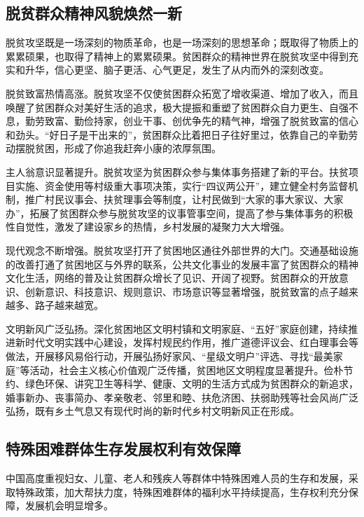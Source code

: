 \documentclass{ctexart}
\begin{document}
\subsection{脱贫群众精神风貌焕然一新}

脱贫攻坚既是一场深刻的物质革命，也是一场深刻的思想革命；既取得了物质上的累累硕果，也取得了精神上的累累硕果。贫困群众的精神世界在脱贫攻坚中得到充实和升华，信心更坚、脑子更活、心气更足，发生了从内而外的深刻改变。

脱贫致富热情高涨。脱贫攻坚不仅使贫困群众拓宽了增收渠道、增加了收入，而且唤醒了贫困群众对美好生活的追求，极大提振和重塑了贫困群众自力更生、自强不息，勤劳致富、勤俭持家，创业干事、创优争先的精气神，增强了脱贫致富的信心和劲头。“好日子是干出来的”，贫困群众比着把日子往好里过，依靠自己的辛勤劳动摆脱贫困，形成了你追我赶奔小康的浓厚氛围。

主人翁意识显著提升。脱贫攻坚为贫困群众参与集体事务搭建了新的平台。扶贫项目实施、资金使用等村级重大事项决策，实行“四议两公开”，建立健全村务监督机制，推广村民议事会、扶贫理事会等制度，让村民做到“大家的事大家议、大家办”，拓展了贫困群众参与脱贫攻坚的议事管事空间，提高了参与集体事务的积极性自觉性，激发了建设家乡的热情，乡村发展的凝聚力大大增强。

现代观念不断增强。脱贫攻坚打开了贫困地区通往外部世界的大门。交通基础设施的改善打通了贫困地区与外界的联系，公共文化事业的发展丰富了贫困群众的精神文化生活，网络的普及让贫困群众增长了见识、开阔了视野。贫困群众的开放意识、创新意识、科技意识、规则意识、市场意识等显著增强，脱贫致富的点子越来越多、路子越来越宽。

文明新风广泛弘扬。深化贫困地区文明村镇和文明家庭、“五好”家庭创建，持续推进新时代文明实践中心建设，发挥村规民约作用，推广道德评议会、红白理事会等做法，开展移风易俗行动，开展弘扬好家风、“星级文明户”评选、寻找“最美家庭”等活动，社会主义核心价值观广泛传播，贫困地区文明程度显著提升。俭朴节约、绿色环保、讲究卫生等科学、健康、文明的生活方式成为贫困群众的新追求，婚事新办、丧事简办、孝亲敬老、邻里和睦、扶危济困、扶弱助残等社会风尚广泛弘扬，既有乡土气息又有现代时尚的新时代乡村文明新风正在形成。

\subsection{特殊困难群体生存发展权利有效保障}

中国高度重视妇女、儿童、老人和残疾人等群体中特殊困难人员的生存和发展，采取特殊政策，加大帮扶力度，特殊困难群体的福利水平持续提高，生存权利充分保障，发展机会明显增多。
\end{document}

